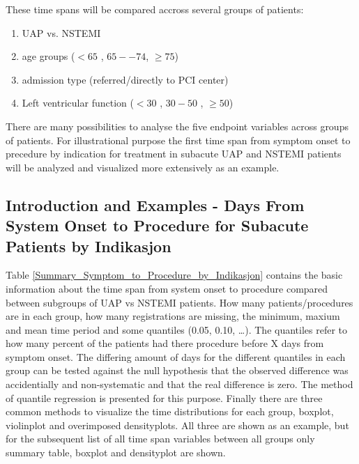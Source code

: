 \documentclass[a4paper]{report}
\begin{document}
\begin{itemize}
{These time spans will be compared accross several groups of patients:
\begin{enumerate}
\item{UAP vs. NSTEMI}
\item{age groups ($<65$ , $65--74$, $\geq75$)}
\item{admission type (referred/directly to PCI center)}
\item{Left ventricular function ($<30$ , $30-50$ , $\geq50$)}
\end{enumerate}

There are many possibilities to analyse the five endpoint variables across groups of patients. For illustrational purpose the first time span from symptom onset to precedure by indication for treatment in subacute UAP and NSTEMI patients will be analyzed and visualized more extensively as an example.


\subsection{Introduction and Examples - Days From System Onset to Procedure for Subacute Patients by Indikasjon}
Table \ref{Summary_Symptom_to_Procedure_by_Indikasjon} contains the basic information about the time span from system onset to procedure compared between subgroups of UAP vs NSTEMI patients. How many patients/procedures are in each group, how many registrations are missing, the minimum, maxium and mean time period and some quantiles (0.05, 0.10, \ldots). The quantiles refer to how many percent of the patients had there procedure before X days from symptom onset. The differing amount of days for the different quantiles in each group can be tested against the null hypothesis that the observed difference was accidentially and non-systematic and that the real difference is zero. The method of quantile regression is presented for this purpose. Finally there are three common methods to visualize the time distributions for each group, boxplot, violinplot and overimposed densityplots. All three are shown as an example, but for the subsequent list of all time span variables between all groups only summary table, boxplot and densityplot are shown.

}
\end{itemize}
\end{document}

